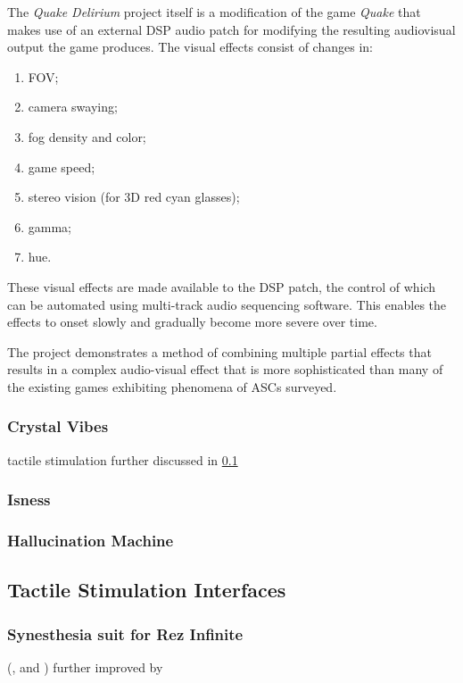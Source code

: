 The \textit{Quake Delirium} project itself is a modification of the game \textit{Quake} that makes use of an external \ac{DSP} audio patch for modifying the resulting audiovisual output the game produces. The visual effects consist of changes in:

\begin{enumerate}
    \item \ac{FOV};
    \item camera swaying;
    \item fog density and color;
    \item game speed;
    \item stereo vision (for 3D red cyan glasses);
    \item gamma;
    \item hue.
\end{enumerate}

These visual effects are made available to the \ac{DSP} patch, the control of which can be automated using multi-track audio sequencing software. This enables the effects to onset slowly and gradually become more severe over time.

The project demonstrates a method of combining multiple partial effects that results in a complex audio-visual effect that is more sophisticated than many of the existing games exhibiting phenomena of \acp{ASC} surveyed.

\subsubsection{Crystal Vibes}
\autocite{outram2017crystal}
tactile stimulation further discussed in \ref{sec:tactile_stimulation_interfaces}

\subsubsection{Isness}
\autocite{glowacki2020isness}

\subsubsection{Hallucination Machine}
\autocite{suzuki2018hallucination}

\subsection{Tactile Stimulation Interfaces}\label{sec:tactile_stimulation_interfaces}

\subsubsection{Synesthesia suit for Rez Infinite}
(\textcite{konishi2016synesthesia1}, \textcite{konishi2016synesthesia2} and \textcite{synesthesia2016suit})
further improved by \autocite{furukawa2019synesthesia}

